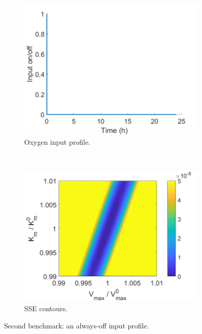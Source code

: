 \begin{figure}[H]
	\centering
	\begin{subfigure}[b]{0.45\textwidth}
		\includegraphics[width=\textwidth]{figure/paper 1/inputLiterature.png}
		\caption{Oxygen input profile.}
		\label{inputcompareLiterature}
	\end{subfigure}
	~ %
	\begin{subfigure}[b]{0.45\textwidth}
		\includegraphics[width=\textwidth]{figure/paper 1/compareLiterature.png}
		\caption{SSE contours.}
		\label{SSEcompareLiterature}
	\end{subfigure}
	\caption{Second benchmark: an always-off input profile.}
	\label{compareLiterature}
\end{figure}
